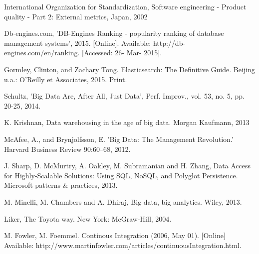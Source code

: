 \begin{thebibliography}{69}
 International Organization for Standardization, Software engineering - Product quality - Part 2: External metrics, Japan, 2002   

 Db-engines.com, 'DB-Engines Ranking - popularity ranking of database management systems', 2015. [Online]. Available: http://db-engines.com/en/ranking. [Accessed: 26- Mar- 2015].

 Gormley, Clinton, and Zachary Tong. Elasticsearch: The Definitive Guide. Beijing u.a.: O'Reilly et Associates, 2015. Print.

 Schultz, 'Big Data Are, After All, Just Data', Perf. Improv., vol. 53, no. 5, pp. 20-25, 2014.

 K. Krishnan, Data warehousing in the age of big data. Morgan Kaufmann, 2013

 McAfee, A., and Brynjolfsson, E. 'Big Data: The Management Revolution.' Harvard Business Review 90:60–68, 2012.

 J.  Sharp, D.  McMurtry, A.  Oakley, M.  Subramanian and H.  Zhang, Data Access for Highly-Scalable Solutions: Using SQL, NoSQL, and Polyglot Persistence. Microsoft patterns \& practices, 2013.

M. Minelli, M. Chambers and A. Dhiraj, Big data, big analytics. Wiley, 2013. 

 Liker, The Toyota way. New York: McGraw-Hill, 2004.

 M. Fowler, M. Foemmel. Continous Integration (2006, May 01). [Online] Available: http://www.martinfowler.com/articles/continuousIntegration.html. 

\end{thebibliography}
